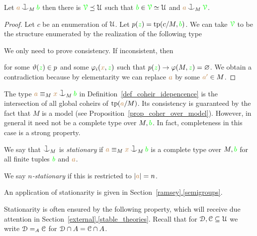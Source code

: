 \documentclass[creche.tex]{subfiles}
\begin{document}
\begin{proposition}\label{prop_saturate_heir}
  Let ${\mr a}\cnonfork_M{\gr b}$ then there is ${\color{green}\EuScript V}\preceq\EuScript U$ such that ${\color{green} b}\in{\color{green}\EuScript V}\simeq\EuScript U$ and ${\mr a}\cnonfork_M{\gr\V}$.
\end{proposition}

\begin{proof}
  Let $c$ be an enumeration of $\EuScript U$.
  Let $p({\color{green} z})={\rm tp}(c/M,{\color{green} b})$.
  We can take ${\color{green}\EuScript V}$ to be the structure enumerated by the realization of the following type 


  We only need to prove consistency.
  If inconsistent, then 

  
for some $\vartheta({\color{green} z})\in p$ and some $\varphi_i({\color{brown} x},{\color{green} z})$ such that $p({\color{green} z})\rightarrow\varphi(M,{\color{green} z})=\varnothing$.
We obtain a contradiction because by elementarity we can replace ${\color{brown} a}$ by some ${\color{brown} a'}\in M$.
\end{proof}


The type ${\mr a}\equiv_M{\mr x}\cnonfork_M{\gr b}$ in Definition~\ref{def_coheir_idepencence} is the intersection of all global coheirs of ${\rm tp}({\color{brown} a}/M)$.
%
Its consistency is guaranteed by the fact that $M$ is a model (see Proposition~\ref{prop_coher_over_model}).
%
However, in general it need not be a complete type over $M,{\color{green} b}$.
%
In fact, completeness in this case is a strong property.

\begin{definition}\label{def_coheir_stationary} We say that $\cnonfork_M$ is \emph{stationary\/} if ${\mr a}\equiv_M{\mr x}\cnonfork_M{\gr b}$ is a complete type over $M,{\color{green} b}$ for all finite tuples ${\color{green} b}$ and ${\color{brown} a}$.

We say \emph{$n$-stationary\/} if this is restricted to $|{\color{brown} a}|=n$.\QED
\end{definition}
%
An application of stationarity is given in Section~\hyperref[stable_theories]{\ref*{ramsey}.\ref*{semigroups}}.

Stationarity is often ensured by the following property, which will receive due attention in Section~\hyperref[stable_theories]{\ref*{external}.\ref*{stable_theories}}. Recall that for $\EuScript D,\EuScript C\subseteq\EuScript U$ we write $\EuScript D=_A\EuScript C$ for $\EuScript D\cap A=\EuScript C\cap A$.
\end{document}
